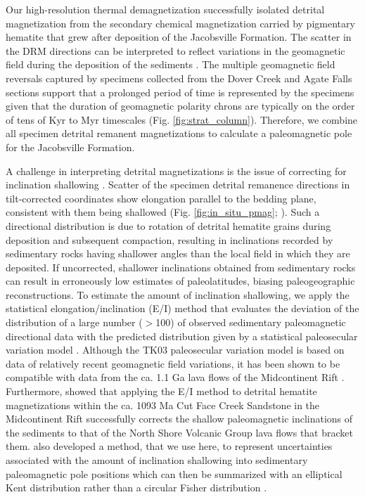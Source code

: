 \documentclass[draft]{agujournal2019}
\begin{document}
Our high-resolution thermal demagnetization successfully isolated detrital magnetization from the secondary chemical magnetization carried by pigmentary hematite that grew after deposition of the Jacobsville Formation. The scatter in the DRM directions can be interpreted to reflect variations in the geomagnetic field during the deposition of the sediments \cite{Steiner1983a, Tauxe1984a}. The multiple geomagnetic field reversals captured by specimens collected from the Dover Creek and Agate Falls sections support that a prolonged period of time is represented by the specimens given that the duration of geomagnetic polarity chrons are typically on the order of tens of Kyr to Myr timescales (Fig. \ref{fig:strat_column}). Therefore, we combine all specimen detrital remanent magnetizations to calculate a paleomagnetic pole for the Jacobsville Formation.

A challenge in interpreting detrital magnetizations is the issue of correcting for inclination shallowing \cite{King1955a, Tauxe2004b, Bilardello2016b}. Scatter of the specimen detrital remanence directions in tilt-corrected coordinates show elongation parallel to the bedding plane, consistent with them being shallowed (Fig. \ref{fig:in_situ_pmag}; ). Such a directional distribution is due to rotation of detrital hematite grains during deposition and subsequent compaction, resulting in inclinations recorded by sedimentary rocks having shallower angles than the local field in which they are deposited. If uncorrected, shallower inclinations obtained from sedimentary rocks can result in erroneously low estimates of paleolatitudes, biasing paleogeographic reconstructions. To estimate the amount of inclination shallowing, we apply the statistical elongation/inclination (E/I) method that evaluates the deviation of the distribution of a large number ($>$100) of observed sedimentary paleomagnetic directional data with the predicted distribution given by a statistical paleosecular variation model \cite{Tauxe2004b}. Although the TK03 paleosecular variation model is based on data of relatively recent geomagnetic field variations, it has been shown to be compatible with data from the ca. 1.1 Ga lava flows of the Midcontinent Rift \cite{Tauxe2009a}. Furthermore,  showed that applying the E/I method to detrital hematite magnetizations within the ca. 1093 Ma Cut Face Creek Sandstone in the Midcontinent Rift successfully corrects the shallow paleomagnetic inclinations of the sediments to that of the North Shore Volcanic Group lava flows that bracket them.  also developed a method, that we use here, to represent uncertainties associated with the amount of inclination shallowing into sedimentary paleomagnetic pole positions which can then be summarized with an elliptical Kent distribution \cite{Kent1982a} rather than a circular Fisher distribution \cite{Fisher1953a}. 
\end{document}
